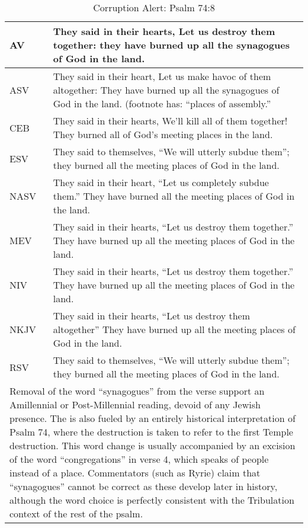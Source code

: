 \begin{center}

\begin{table}[ht]
\centering
\begin{tabular}{|p{.5in}|p{3.5in}|}
\hline

\textcolor[rgb]{0.00,0.00,1.00}{AV} & \textcolor[rgb]{0.00,0.00,1.00}{They said in their hearts, Let us destroy them together: they have burned up all the synagogues of God in the land.} \\ \hline 

\hline
\hline


ASV &  They said in their heart, Let us make havoc of them altogether: They have burned up all the synagogues of God in the land. (footnote has: ``places of assembly.'' \\ \hline
CEB &  They said in their hearts, We’ll kill all of them together! They burned all of God’s meeting places in the land.\\ \hline
ESV & They said to themselves, ``We will utterly subdue them''; they burned all the meeting places of God in the land. \\ \hline
NASV &  They said in their heart, ``Let us completely subdue them.'' They have burned all the meeting places of God in the land. \\ \hline
MEV & They said in their hearts, ``Let us destroy them together.''     They have burned up all the meeting places of God in the land.\\ \hline
NIV &  They said in their hearts, ``Let us destroy them together.''     They have burned up all the meeting places of God in the land.\\ \hline
NKJV &  They said in their hearts, ``Let us destroy them altogether'' They have burned up all the meeting places of God in the land. \\ \hline
RSV &  They said to themselves, ``We will utterly subdue them'';  they burned all the meeting places of God in the land.\\ \hline

\hline
\hline

\multicolumn{2}{|p{4.3in}|}{{\textcolor{jungle}{Removal of the word ``synagogues'' from the verse support an Amillennial or Post-Millennial reading, devoid of any Jewish presence. The is also fueled by an entirely historical interpretation of Psalm 74, where the destruction is taken to refer to the first Temple destruction. This word change is usually accompanied by an excision of the word ``congregations'' in verse 4, which speaks of people instead of a place. Commentators (such as Ryrie) claim that ``synagogues'' cannot be correct as these develop later in history, although the word choice is perfectly consistent with the Tribulation context of the rest of the psalm.}}} \\ \hline

\end{tabular}
\caption[Corruption Alert: Psalm 74:8]{Corruption Alert: Psalm 74:8} \label{table:Corruption Psalm 74:8}

\end{table}

\end{center}




